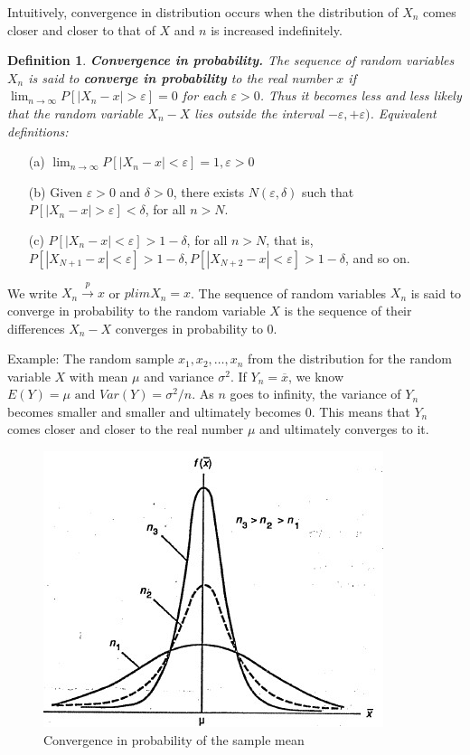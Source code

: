 \documentclass{article}
\newtheorem{definition}{Definition}[section]
\begin{document}
Intuitively, convergence in distribution occurs when the distribution of \(X_n\) comes closer and closer to that of \(X\) and \(n\) is increased indefinitely.

\begin{definition} \textbf{Convergence in probability.}
    The sequence of random variables \(X_n\) is said to \textbf{converge in probability} to the real number $x$ if \(\lim_{n \rightarrow \infty} P[|X_n-x|>\varepsilon]=0\) for each \(\varepsilon>0\). Thus it becomes less and less likely that the random variable $X_n-X$ lies outside the interval \(-\varepsilon,+\varepsilon)\). Equivalent definitions:
\end{definition}
\begin{itemize}
    \item[(a)] \( \lim_{n \rightarrow \infty} P[|X_n-x|<\varepsilon]=1, \varepsilon>0\)
    \item[(b)] Given \(\varepsilon>0\) and \(\delta>0\), there exists \(N(\varepsilon,\delta)\) such that \(P[|X_n-x|>\varepsilon]<\delta\), for all \(n>N\).
    \item[(c)] \(P[|X_n-x|<\varepsilon]>1-\delta\), for all \(n>N\), that is, \(P[|X_{N+1}-x|<\varepsilon]>1-\delta, P[|X_{N+2}-x|<\varepsilon]>1-\delta\), and so on.
\end{itemize}

We write \(X_n \stackrel{p}{\longrightarrow} x\) or \(plim X_n=x\). The sequence of random variables \(X_n\) is said to converge in probability to the random variable \(X\) is the sequence of their differences \(X_n-X\) converges in probability to 0.

Example: The random sample \(x_1,x_2,\dots,x_n\) from the distribution for the random variable \(X\) with mean \(\mu\) and variance \(\sigma^2\). If \(Y_n=\overline{x}\), we know \(E(Y)=\mu \text{ and } Var(Y)=\sigma^2/n\). As \(n\) goes to infinity, the variance of \(Y_n\) becomes smaller and smaller and ultimately becomes 0. This means that \(Y_n\) comes closer and closer to the real number \(\mu\) and ultimately converges to it.

\begin{figure} [H]
    \centering
    \includegraphics{pics/convergence.jpg}
    \caption{Convergence in probability of the sample mean}
    \label{fig:enter-label8}
\end{figure}
\end{document}
